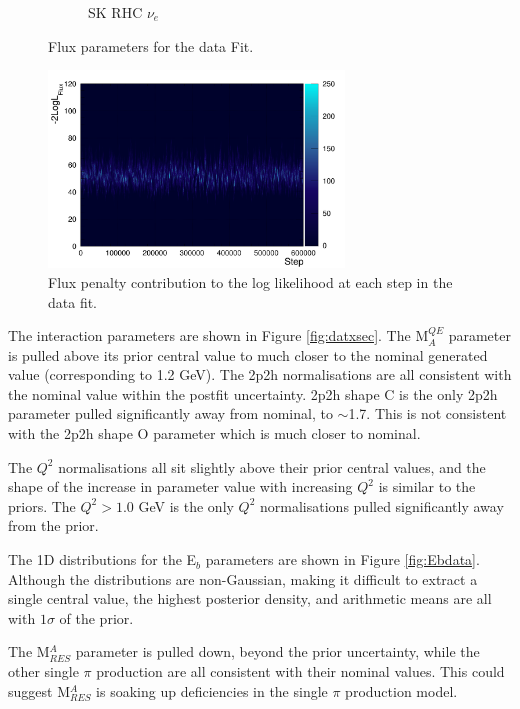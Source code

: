 \begin{figure}
\begin{subfigure}{0.24\textwidth}
  \caption{SK RHC $\nu_e$}
  \label{fig:}
\end{subfigure}
\caption{Flux parameters for the data Fit.}
\label{fig:datfluxSK}
\end{figure}

\begin{figure}
\centering
\includegraphics*[width=0.7\textwidth,clip]{figs/llh_fluxdat}
\caption{Flux penalty contribution to the log likelihood at each step in the data fit.}\label{fig:llh_fluxdat}
\end{figure}

The interaction parameters are shown in Figure \ref{fig:datxsec}. The M$^{QE}_A$ parameter is pulled above its prior central value to much closer to the nominal generated value (corresponding to 1.2 GeV). The 2p2h normalisations are all consistent with the nominal value within the postfit uncertainty. 2p2h shape C is the only 2p2h parameter pulled significantly away from nominal, to $\sim$1.7. This is not consistent with the 2p2h shape O parameter which is much closer to nominal.

The $Q^2$ normalisations all sit slightly above their prior central values, and the shape of the increase in parameter value with increasing $Q^2$ is similar to the priors. The $Q^2>1.0$ GeV is the only $Q^2$ normalisations pulled significantly away from the prior.

The 1D distributions for the E$_b$ parameters are shown in Figure \ref{fig:Ebdata}. Although the distributions are non-Gaussian, making it difficult to extract a single central value, the highest posterior density, and arithmetic means are all with $1\sigma$ of the prior.

The M$^A_{RES}$ parameter is pulled down, beyond the prior uncertainty, while the other single $\pi$ production are all consistent with their nominal values. This could suggest M$^A_{RES}$ is soaking up deficiencies in the single $\pi$ production model.


